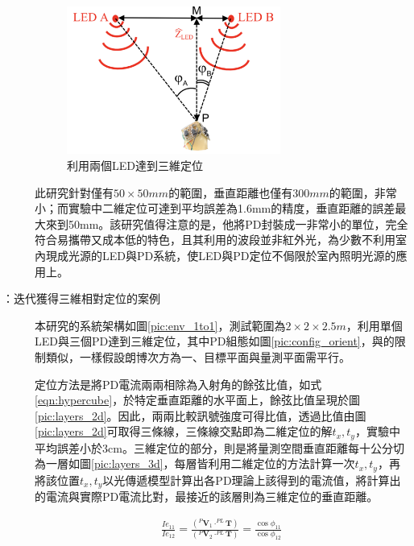 \begin{description}
       

        \begin{figure}[h]
            \centering
            \includegraphics[width=7cm]{ch2pic/hypercube_2led.png}
            \caption{\cite{case:hypercube}利用兩個LED達到三維定位}
            \label{pic:hypercube_2led}
        \end{figure}
        
        \qquad
        此研究針對僅有$50\times 50mm$的範圍，垂直距離也僅有$300mm$的範圍，非常小；而實驗中二維定位可達到平均誤差為1.6mm的精度，垂直距離的誤差最大來到50mm。該研究值得注意的是，他將PD封裝成一非常小的單位，完全符合易攜帶又成本低的特色，且其利用的波段並非紅外光，為少數不利用室內現成光源的LED與PD系統，使LED與PD定位不侷限於室內照明光源的應用上。

        \item[\cite{case:3d_layers}：迭代獲得三維相對定位的案例] \hfill 
        
        \qquad
        本研究的系統架構如圖\ref{pic:env_1to1}，測試範圍為$2\times 2\times 2.5m$，利用單個LED與三個PD達到三維定位，其中PD組態如圖\ref{pic:config_orient}，與\cite{case:hypercube}的限制類似，一樣假設朗博次方為一、目標平面與量測平面需平行。
        
        定位方法是將PD電流兩兩相除為入射角的餘弦比值，如式\ref{eqn:hypercube}，於特定垂直距離的水平面上，餘弦比值呈現於圖\ref{pic:layers_2d}。因此，兩兩比較訊號強度可得比值，透過比值由圖\ref{pic:layers_2d}可取得三條線，三條線交點即為二維定位的解$t_x,t_y$，實驗中平均誤差小於3cm。三維定位的部分，則是將量測空間垂直距離每十公分切為一層如圖\ref{pic:layers_3d}，每層皆利用二維定位的方法計算一次$t_x,t_y$，再將該位置$t_x,t_y$以光傳遞模型計算出各PD理論上該得到的電流值，將計算出的電流與實際PD電流比對，最接近的該層則為三維定位的垂直距離。

         \begin{equation}
            \label{eqn:hypercube}
            \begin{aligned}
                    \frac{Ie_{11}}{Ie_{12}}= 
                \frac{
                    ( ^{P}\boldsymbol{V}_1 \cdot 
                    ^{PL}\boldsymbol{T}
                    )
                 } 
                    {
                        ( ^{P}\boldsymbol{V}_2 \cdot 
                                ^{PL}\boldsymbol{T}
                        )
                    }=\frac{\cos\phi_{11}}{\cos\phi_{12}}
            \end{aligned}
        \end{equation}


\end{description}
